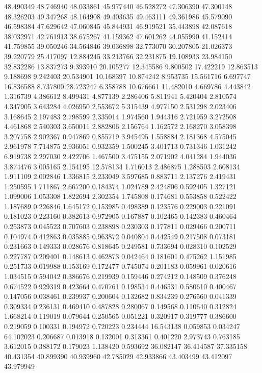 48.490349
48.746940
48.033861
45.977440
46.528272
47.306390
47.300148
48.326203
49.347268
48.164908
49.403635
49.463111
49.361986
45.579090
46.598384
47.629642
47.060845
45.844931
46.919521
35.443898
42.087618
38.032971
42.761913
38.675267
41.159362
47.601262
44.055990
41.152414
41.759855
39.050246
34.564846
39.036898
32.773070
30.207805
21.026373
39.220779
25.417097
12.884245
33.213766
32.231875
19.108933
23.984150
32.832286
13.837273
9.393910
20.105277
12.345586
9.800502
17.422219
12.863513
9.188698
9.242403
20.534901
10.168397
10.874242
8.953735
15.561716
6.697747
16.836588
8.737800
28.723247
6.358788
10.676661
11.482010
4.669786
4.443842
1.316739
4.386612
8.499431
4.877139
2.286406
5.811941
5.420404
2.810574
4.347905
3.643284
4.026950
2.553672
5.315439
4.977150
2.531298
2.023406
3.168645
2.197483
2.798599
2.335014
1.974560
1.944316
2.721959
3.272508
4.461868
2.540303
3.650011
2.882806
2.156764
1.162572
2.168270
3.058398
3.207758
2.902367
0.947869
0.855719
3.945495
1.558884
2.181368
4.575045
2.961978
7.714875
2.936051
0.932359
1.500245
3.401713
0.731346
1.031242
6.919738
2.297030
2.422706
1.467500
3.475155
2.071902
4.041284
1.944036
3.874476
3.005165
2.154195
12.578134
1.716013
2.486875
1.288503
2.608134
1.911109
2.002846
1.336815
2.233049
3.597685
0.883711
2.137276
2.419431
1.250595
1.711867
2.667200
0.184374
1.024789
2.424806
0.592405
1.327121
1.099006
1.053308
1.822694
2.302354
1.745808
0.174681
0.553858
0.522422
1.187689
0.226846
1.645172
0.153985
0.498389
0.123576
0.229003
0.221091
0.181023
0.223160
0.382613
0.972905
0.167887
0.102465
0.142383
0.460464
0.253873
0.045523
0.707603
0.238898
0.230303
0.177811
0.029466
0.200711
0.104974
0.412863
0.035885
0.963872
0.040804
0.442549
0.217508
0.073181
0.231663
0.149333
0.028676
0.818645
0.249581
0.733694
0.028310
0.102529
0.227787
0.209401
0.148613
0.462873
0.042464
0.181601
0.475262
1.151985
0.251733
0.019988
0.153169
0.172477
0.745074
0.201183
0.059961
0.020616
1.034515
0.594042
0.386676
0.219939
0.159446
0.274212
0.148509
0.376248
0.674522
0.929319
0.423664
0.470761
0.198534
0.446531
0.580610
0.400467
0.147056
0.038461
0.239937
0.200604
0.132682
0.834239
0.276560
0.041339
0.309334
0.236131
0.469410
0.487828
0.280067
0.149568
0.110640
0.312824
1.668214
0.119019
0.079644
0.250565
0.051221
0.320917
0.319777
0.386600
0.219059
0.100331
0.194972
0.720223
0.234444
16.543138
0.059853
0.034247
64.102023
0.206687
0.013918
0.132001
0.313361
0.401220
2.973743
0.763185
3.612015
0.388172
0.179023
1.138420
0.593692
36.082147
36.414587
37.335158
40.431354
40.899390
40.939960
42.785029
42.933866
43.403499
43.412097
43.979949
